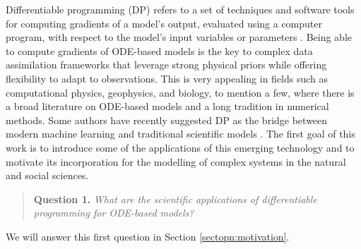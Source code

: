 Differentiable programming (DP) refers to a set of techniques and software tools for computing gradients of a model's output, evaluated using a computer program, with respect to the model's input variables or parameters \cite{Shen_diff_modelling, Innes_Zygote, blondel2024elements}.
Being able to compute gradients of ODE-based models is the key to complex data assimilation frameworks that leverage strong physical priors while offering flexibility to adapt to observations.
This is very appealing in fields such as computational physics, geophysics, and biology, to mention a few, where there is a broad literature on ODE-based models and a long tradition in numerical methods. 
Some authors have recently suggested DP as the bridge between modern machine learning and traditional scientific models \cite{Ramsundar_Krishnamurthy_Viswanathan_2021, Shen_diff_modelling, Gelbrecht-differential-programming-Earth, rackauckas2021generalized}. 
The first goal of this work is to introduce some of the applications of this emerging technology and to motivate its incorporation for the modelling of complex systems in the natural and social sciences. 
\begin{quote}
    \textbf{Question 1. }
    \textit{What are the scientific applications of differentiable programming for ODE-based models?}
\end{quote}
We will answer this first question in Section \ref{sectopn:motivation}. 

